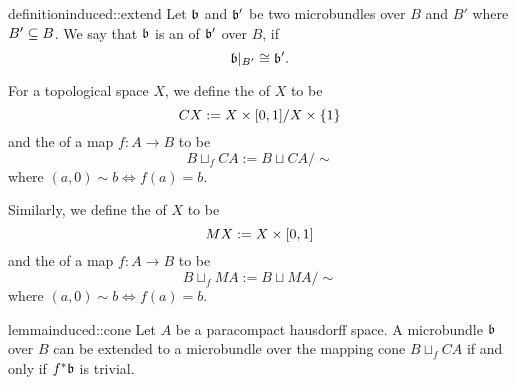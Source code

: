 \begin{mystatement}{definition}{induced::extend}
    Let $\bb$ and $\bb'$ be two microbundles over $B$ and $B'$ where $B' \subseteq{} B$.
    We say that $\bb$ is an  of $\bb'$ over $B$, if
    \[ \bb[B'] \cong \bb'. \]
\end{mystatement}

\begin{myparagraph}
    For a topological space $X$, we define the  of $X$ to be 
    \[ CX := X \times{} [0, 1] / X \times \{1\} \]
    and the  of a map $f: A \to B$ to be
    \[ B \sqcup_f CA := B \sqcup CA / \sim \]
    where $(a, 0) \sim b \iff f(a) = b$.
    
    Similarly, we define the  of $X$ to be
    \[ MX := X \times{} [0, 1] \]
    and the  of a map $f: A \to B$ to be
    \[ B \sqcup_f MA := B \sqcup MA / \sim \]
    where $(a, 0) \sim b \iff f(a) = b$.
\end{myparagraph}

\begin{mystatement}{lemma}{induced::cone}
    Let $A$ be a paracompact hausdorff space.
    A microbundle $\bb$ over $B$ can be extended to a microbundle
    over the mapping cone $B \sqcup_f CA$ if and only if $\ind{f}\bb$ is trivial.
\end{mystatement}

